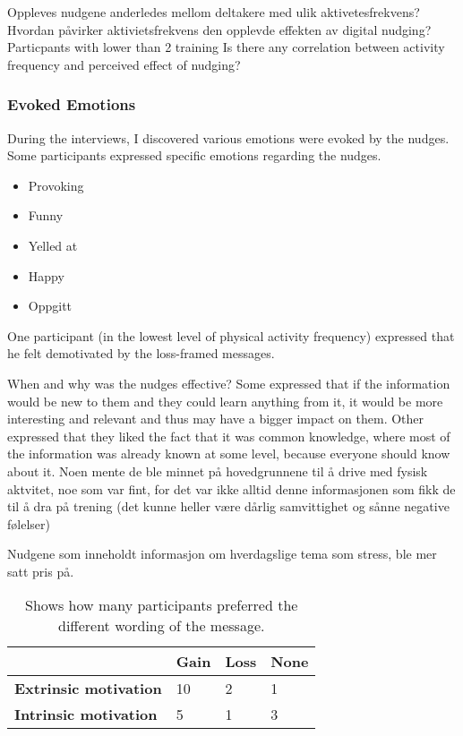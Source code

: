Oppleves nudgene anderledes mellom deltakere med ulik aktivetesfrekvens? 
Hvordan påvirker aktivietsfrekvens den opplevde effekten av digital nudging?
Particpants with lower than 2 training 
Is there any correlation between activity frequency and perceived effect of nudging?

\subsubsection{Evoked Emotions}
During the interviews, I discovered various emotions were evoked by the nudges. Some participants expressed specific emotions regarding the nudges. 
\begin{itemize}
\item Provoking
\item Funny
\item Yelled at
\item Happy
\item Oppgitt
\end{itemize}

One participant (in the lowest level of physical activity frequency) expressed that he felt demotivated by the loss-framed messages. 

When and why was the nudges effective?
Some expressed that if the information would be new to them and they could learn anything from it, it would be more interesting and relevant and thus may have a bigger impact on them.
Other expressed that they liked the fact that it was common knowledge, where most of the information was already known at some level, because everyone should know about it. 
Noen mente de ble minnet på hovedgrunnene til å drive med fysisk aktvitet, noe som var fint, for det var ikke alltid denne informasjonen som fikk de til å dra på trening (det kunne heller være dårlig samvittighet og sånne negative følelser)

Nudgene som inneholdt informasjon om hverdagslige tema som stress, ble mer satt pris på. 

\begin{table}[ht]
\begin{center}
\begin{tabular}{ |  m{10em} | m{1.5cm}| m{1.5cm} | m{1.5cm} |} 
\hline
  &  \textbf{Gain} & \textbf{Loss} & \textbf{None} \\ 
\hline
\textbf{Extrinsic motivation} & 10 & 2 & 1  \\ 
\hline
\textbf{Intrinsic motivation} & 5 & 1 & 3  \\ 
\hline
\end{tabular}
\caption{\label{tab:table-name} Shows how many participants preferred the different wording of the message.}
\end{center}
\end{table}

